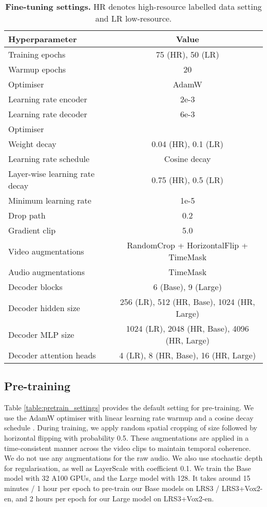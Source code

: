 \documentclass{article} \usepackage{iclr2023_conference,times}
\begin{document}
\begin{table}
\centering
\begin{tabular}[b]{l | c}
Hyperparameter & Value \\ \midrule
Training epochs & 75 (HR), 50 (LR) \\
Warmup epochs & 20 \\
Optimiser & AdamW \\
Learning rate encoder & 2e-3 \\
Learning rate decoder & 6e-3 \\ 
Optimiser  &  \\
Weight decay & 0.04 (HR), 0.1 (LR) \\
Learning rate schedule & Cosine decay \\
Layer-wise learning rate decay & 0.75 (HR), 0.5 (LR) \\
Minimum learning rate & 1e-5 \\
Drop path & 0.2  \\
Gradient clip & 5.0 \\
Video augmentations & RandomCrop + HorizontalFlip + TimeMask \\
Audio augmentations & TimeMask \\
Decoder blocks & 6 (Base), 9 (Large) \\
Decoder hidden size & 256 (LR), 512 (HR, Base), 1024 (HR, Large) \\
Decoder MLP size & 1024 (LR), 2048 (HR, Base), 4096 (HR, Large) \\
Decoder attention heads & 4 (LR), 8 (HR, Base), 16 (HR, Large) \\
\end{tabular}
\caption{\textbf{Fine-tuning settings.} HR denotes high-resource labelled data setting and LR low-resource.}
\label{table:finetune_settings}
\end{table}

\subsection{Pre-training}
Table \ref{table:pretrain_settings} provides the default setting for pre-training. We use the AdamW \citep{loshchilov2017decoupled} optimiser with linear learning rate warmup \citep{goyal2017accurate} and a cosine decay schedule \citep{loshchilov2016sgdr}. During training, we apply random spatial cropping of size  followed by horizontal flipping with probability 0.5. These augmentations are applied in a time-consistent manner across the video clips to maintain temporal coherence. We do not use any augmentations for the raw audio. We also use stochastic depth \citep{huang2016deep} for regularisation, as well as LayerScale \citep{touvron2021going} with coefficient 0.1. We train the Base model with 32 A100 GPUs, and the Large model with 128. It takes around 15 minutes / 1 hour per epoch to pre-train our Base models on LRS3 / LRS3+Vox2-en, and 2 hours per epoch for our Large model on LRS3+Vox2-en.
\end{document}

